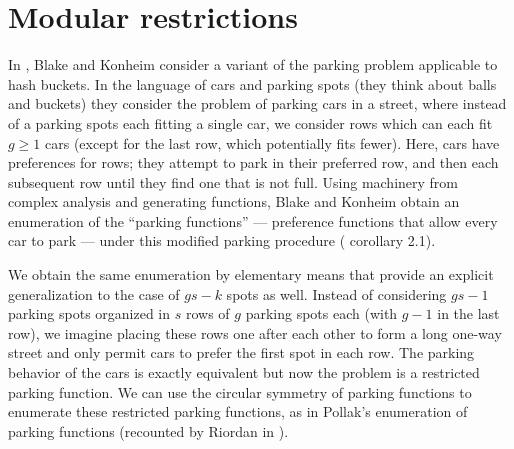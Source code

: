 \documentclass[12 pt]{amsart}
\theoremstyle{definition} %
\theoremstyle{remark} %
\begin{document}
\section{Modular restrictions \label{modularsection}}

In \cite{blake-konheim-1977}, Blake and Konheim consider a variant of the parking problem applicable to hash buckets. In the language of cars and parking spots (they think about balls and buckets) they consider the problem of parking cars in a street, where instead of a parking spots each fitting a single car, we consider rows which can each fit $g\ge 1$ cars (except for the last row, which potentially fits fewer). Here, cars have preferences for rows; they attempt to park in their preferred row, and then each subsequent row until they find one that is not full. Using machinery from complex analysis and generating functions, Blake and Konheim obtain an enumeration of the ``parking functions'' --- preference functions that allow every car to park --- under this modified parking procedure (\cite{blake-konheim-1977} corollary 2.1).

We obtain the same enumeration by elementary means that provide an explicit generalization to the case of $gs - k$ spots as well. Instead of considering $gs - 1$ parking spots organized in $s$ rows of $g$ parking spots each (with $g - 1$ in the last row), we imagine placing these rows one after each other to form a long one-way street and only permit cars to prefer the first spot in each row. The parking behavior of the cars is exactly equivalent but now the problem is a restricted parking function. We can use the circular symmetry of parking functions to enumerate these restricted parking functions, as in Pollak's enumeration of parking functions (recounted by Riordan in \cite{riordan-1969}).
\end{document}
